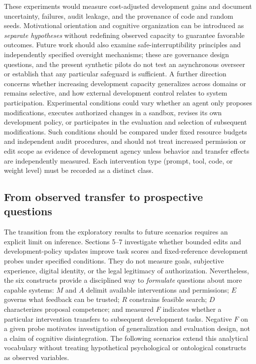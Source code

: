 \documentclass[11pt,a4paper]{article}
\begin{document}
These experiments would measure cost-adjusted development gains and document uncertainty, failures, audit leakage, and the provenance of
code and random seeds. Motivational orientation and cognitive organization can be introduced as \emph{separate hypotheses} without redefining observed capacity to guarantee favorable outcomes. Future work should also examine safe-interruptibility principles \cite{orseau2016} and independently specified oversight mechanisms; these are governance design questions, and the present synthetic pilots do not test an asynchronous overseer or establish that any particular safeguard is sufficient. A further direction concerns whether increasing development capacity generalizes across domains or remains selective, and how external development control relates to system participation. Experimental conditions could vary whether an agent only proposes modifications, executes authorized changes in a sandbox, revises its own development policy, or participates in the evaluation and selection of subsequent modifications. Such conditions should be compared under fixed resource budgets and independent audit procedures, and should not treat increased permission or edit scope as evidence of development agency unless behavior and transfer effects are independently measured. Each intervention type (prompt, tool, code, or weight level) must be recorded as a distinct class.

\subsection{From observed transfer to prospective questions}
The transition from the exploratory results to future scenarios requires an explicit limit on inference. Sections 5--7 investigate whether bounded edits and development-policy updates improve task scores and fixed-reference development probes under specified conditions. They do not measure goals, subjective experience, digital identity, or the legal legitimacy of authorization. Nevertheless, the six constructs provide a disciplined way to \emph{formulate} questions about more capable systems: $M$ and $A$ delimit available interventions and permissions; $E$ governs what feedback can be trusted; $R$ constrains feasible search; $D$ characterizes proposal competence; and measured $F$ indicates whether a particular intervention transfers to subsequent development tasks. Negative $F$ on a given probe motivates investigation of generalization and evaluation design, not a claim of cognitive disintegration. The following scenarios extend this analytical vocabulary without treating hypothetical psychological or ontological constructs as observed variables.
\end{document}

